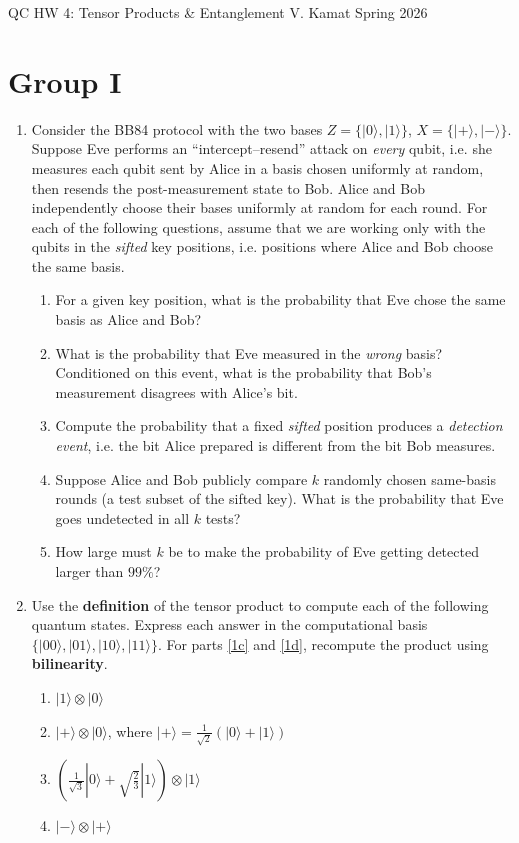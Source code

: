 \documentclass[12pt]{article}
\begin{document}
	
\centerline{QC HW 4: Tensor Products \& Entanglement
	\hspace{0.4 in}V. Kamat
	\hspace{0.4 in}Spring 2026}

\section*{Group I}


\begin{enumerate}
\item Consider the BB84 protocol with the two bases $Z=\{|0\rangle,|1\rangle\}$, $X=\{|+\rangle,|-\rangle\}$.
Suppose Eve performs an ``intercept--resend'' attack on \emph{every} qubit, i.e. she measures each qubit sent by Alice in a basis chosen uniformly at random, then resends the post-measurement state to Bob. Alice and Bob independently choose their bases uniformly at random for each round. For each of the following questions, assume that we are working only with the qubits in the \textit{sifted} key positions, i.e. positions where Alice and Bob choose the same basis. 

\begin{enumerate}
\item[(a)] For a given key position, what is the probability that Eve chose the same basis as Alice and Bob? 

\item[(b)] What is the probability that Eve measured in the \emph{wrong} basis? Conditioned on this event, what is the probability that Bob's measurement disagrees with Alice's bit. 

\item[(c)] Compute the probability that a fixed \textit{sifted} position produces a \emph{detection event}, i.e. the bit Alice prepared is different from the bit Bob measures.

\item[(d)] Suppose Alice and Bob publicly compare $k$ randomly chosen same-basis rounds (a test subset of the sifted key). What is the probability that Eve goes undetected in all $k$ tests?

\item[(e)] How large must $k$ be to make the probability of Eve getting detected larger than $99\%$?
\end{enumerate}
\item Use the \textbf{definition} of the tensor product to compute each of the following quantum states. Express each answer in the computational basis $\{|00\rangle, |01\rangle, |10\rangle, |11\rangle\}$. For parts \ref{1c} and \ref{1d}, recompute the product using \textbf{bilinearity}.  
\begin{enumerate}
    \item $|1\rangle \otimes |0\rangle$
    \item $|+\rangle \otimes |0\rangle$, where $|+\rangle = \frac{1}{\sqrt{2}}(|0\rangle + |1\rangle)$
    \item \label{1c} $\left(\frac{1}{\sqrt{3}}|0\rangle + \sqrt{\frac{2}{3}}|1\rangle\right) \otimes |1\rangle$
    \item \label{1d} $|-\rangle \otimes |+\rangle$
\end{enumerate}


\end{enumerate}
\end{document}
